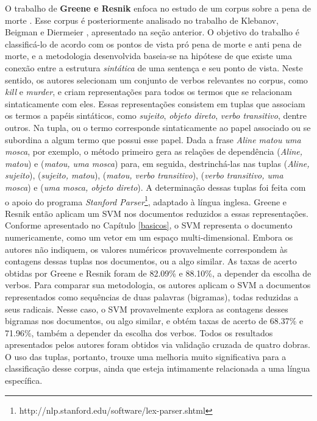 O trabalho de \textbf{Greene e Resnik} enfoca no estudo de um corpus sobre a pena de morte \cite{greene}. Esse corpus é posteriormente analisado no trabalho de Klebanov, Beigman e Diermeier \cite{klebanov}, apresentado na seção anterior. O objetivo do trabalho é classificá-lo de acordo com os pontos de vista pró pena de morte e anti pena de morte, e a metodologia desenvolvida baseia-se na hipótese de que existe uma conexão entre a estrutura \emph{sintática} de uma sentença e seu ponto de vista. Neste sentido, os autores selecionam um conjunto de verbos relevantes no corpus, como \emph{kill} e \emph{murder}, e criam representações para todos os termos que se relacionam sintaticamente com eles. Essas representações consistem em tuplas que associam os termos a papéis sintáticos, como \emph{sujeito}, \emph{objeto direto}, \emph{verbo transitivo}, dentre outros. Na tupla, ou o termo corresponde sintaticamente ao papel associado ou se subordina a algum termo que possui esse papel. Dada a frase \emph{Aline matou uma mosca}, por exemplo, o método primeiro gera as relações de dependência (\emph{Aline, matou}) e (\emph{matou, uma mosca}) para, em seguida, destrinchá-las nas tuplas (\emph{Aline, sujeito}), (\emph{sujeito, matou}), (\emph{matou, verbo transitivo}), (\emph{verbo transitivo, uma mosca}) e (\emph{uma mosca, objeto direto}). A determinação dessas tuplas foi feita com o apoio do programa \emph{Stanford Parser}\footnote{http://nlp.stanford.edu/software/lex-parser.shtml}, adaptado à língua inglesa. Greene e Resnik então aplicam um SVM nos documentos reduzidos a essas representações. Conforme apresentado no Capítulo \ref{basicos}, o SVM representa o documento numericamente, como um vetor em um espaço multi-dimensional. Embora os autores não indiquem, os valores numéricos provavelmente correspondem às contagens dessas tuplas nos documentos, ou a algo similar. As taxas de acerto obtidas por Greene e Resnik foram de 82.09\% e 88.10\%, a depender da escolha de verbos. Para comparar sua metodologia, os autores aplicam o SVM a documentos representados como sequências de duas palavras (bigramas), todas reduzidas a seus radicais. Nesse caso, o SVM provavelmente explora as contagens desses bigramas nos documentos, ou algo similar, e obtém taxas de acerto de 68.37\% e 71.96\%, também a depender da escolha dos verbos. Todos os resultados apresentados pelos autores foram obtidos via validação cruzada de quatro dobras. O uso das tuplas, portanto, trouxe uma melhoria muito significativa para a classificação desse corpus, ainda que esteja intimamente relacionada a uma língua específica.

